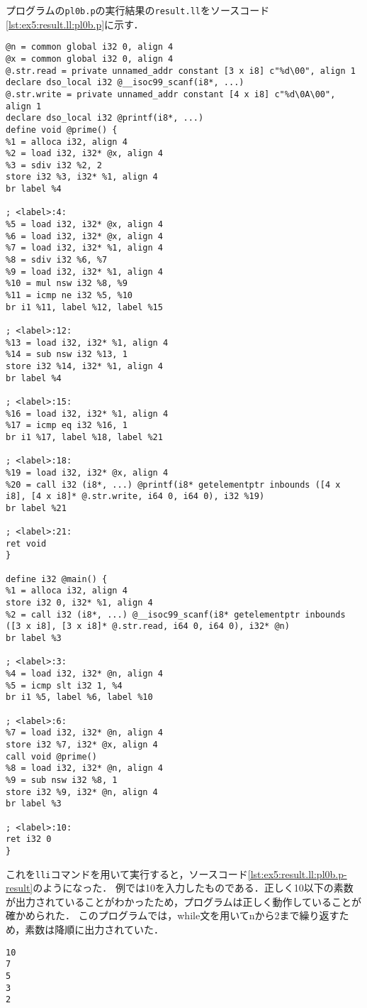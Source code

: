 \documentclass[uplatex]{jsarticle}
\begin{document}
プログラムの\verb#pl0b.p#の実行結果の\verb#result.ll#をソースコード\ref{lst:ex5:result.ll:pl0b.p}に示す．
\begin{lstlisting}[caption=condition句の処理,label=lst:ex5:result.ll:pl0b.p]
@n = common global i32 0, align 4
@x = common global i32 0, align 4
@.str.read = private unnamed_addr constant [3 x i8] c"%d\00", align 1
declare dso_local i32 @__isoc99_scanf(i8*, ...)
@.str.write = private unnamed_addr constant [4 x i8] c"%d\0A\00", align 1
declare dso_local i32 @printf(i8*, ...)
define void @prime() {
%1 = alloca i32, align 4
%2 = load i32, i32* @x, align 4
%3 = sdiv i32 %2, 2
store i32 %3, i32* %1, align 4
br label %4

; <label>:4:
%5 = load i32, i32* @x, align 4
%6 = load i32, i32* @x, align 4
%7 = load i32, i32* %1, align 4
%8 = sdiv i32 %6, %7
%9 = load i32, i32* %1, align 4
%10 = mul nsw i32 %8, %9
%11 = icmp ne i32 %5, %10
br i1 %11, label %12, label %15

; <label>:12:
%13 = load i32, i32* %1, align 4
%14 = sub nsw i32 %13, 1
store i32 %14, i32* %1, align 4
br label %4

; <label>:15:
%16 = load i32, i32* %1, align 4
%17 = icmp eq i32 %16, 1
br i1 %17, label %18, label %21

; <label>:18:
%19 = load i32, i32* @x, align 4
%20 = call i32 (i8*, ...) @printf(i8* getelementptr inbounds ([4 x i8], [4 x i8]* @.str.write, i64 0, i64 0), i32 %19)
br label %21

; <label>:21:
ret void
}

define i32 @main() {
%1 = alloca i32, align 4
store i32 0, i32* %1, align 4
%2 = call i32 (i8*, ...) @__isoc99_scanf(i8* getelementptr inbounds ([3 x i8], [3 x i8]* @.str.read, i64 0, i64 0), i32* @n)
br label %3

; <label>:3:
%4 = load i32, i32* @n, align 4
%5 = icmp slt i32 1, %4
br i1 %5, label %6, label %10

; <label>:6:
%7 = load i32, i32* @n, align 4
store i32 %7, i32* @x, align 4
call void @prime()
%8 = load i32, i32* @n, align 4
%9 = sub nsw i32 %8, 1
store i32 %9, i32* @n, align 4
br label %3

; <label>:10:
ret i32 0
}
\end{lstlisting}
これを\verb#lli#コマンドを用いて実行すると，ソースコード\ref{lst:ex5:result.ll:pl0b.p-result}のようになった．
例では10を入力したものである．正しく10以下の素数が出力されていることがわかったため，プログラムは正しく動作していることが確かめられた．
このプログラムでは，while文を用いてnから2まで繰り返すため，素数は降順に出力されていた．
\begin{lstlisting}[caption=pl0b.pから出力されたresult.llの実行結果,label=lst:ex5:result.ll:pl0b.p-result]
10
7
5
3
2
\end{lstlisting}
\end{document}
